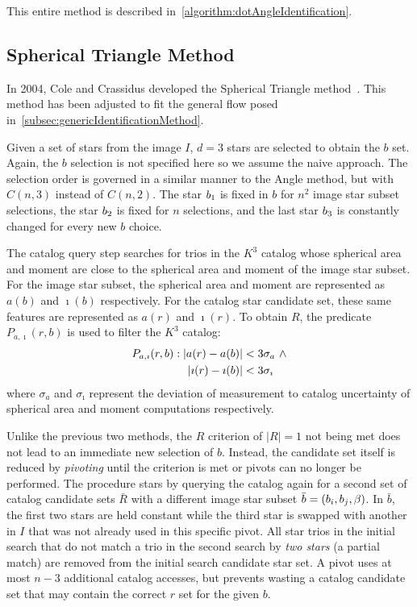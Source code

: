 This entire method is described in~\autoref{algorithm:dotAngleIdentification}.

\subsection{Spherical Triangle Method}\label{subsec:sphericalTriangleMethod}
In 2004, Cole and Crassidus developed the Spherical Triangle method~\cite{Spherical}.
This method has been adjusted to fit the general flow posed in~\autoref{subsec:genericIdentificationMethod}.

Given a set of stars from the image $I$, $d = 3$ stars are selected to obtain the $b$ set.
Again, the $b$ selection is not specified here so we assume the naive approach.
The selection order is governed in a similar manner to the Angle method, but with $C(n, 3)$ instead of
$C(n, 2)$.
The star $b_1$ is fixed in $b$ for $n^2$ image star subset selections, the star $b_2$ is fixed for
$n$ selections, and the last star $b_3$ is constantly changed for every new $b$ choice.

The catalog query step searches for trios in the $K^3$ catalog whose spherical area and moment
are close to the spherical area and moment of the image star subset.
For the image star subset, the spherical area and moment are represented as $a(b)$ and $\imath(b)$ respectively.
For the catalog star candidate set, these same features are represented as $a(r)$ and $\imath(r)$.
To obtain $R$, the predicate $P_{a, \imath}(r, b)$ is used to filter the $K^3$ catalog:
\begin{equation}
    \begin{aligned}
        P_{a, \imath}(r, b) : \left|  a(r) - a(b) \right| &< 3\sigma_{a}
        \ \land \\ \left| \imath(r) - \imath(b) \right| &< 3\sigma_{\imath}
    \end{aligned}
\end{equation}
where $\sigma_a$ and $\sigma_\imath$ represent the deviation of measurement to catalog uncertainty of spherical area
and moment computations respectively.

Unlike the previous two methods, the $R$ criterion of $|R| = 1$ not being met does not lead to an immediate new
selection of $b$.
Instead, the candidate set itself is reduced by \textit{pivoting} until the criterion is met or pivots can no longer
be performed.
The procedure stars by querying the catalog again for a second set of catalog candidate sets $\bar{R}$ with a
different image star subset $\bar{b} = \left(b_i, b_j, \beta\right)$.
In $\bar{b}$, the first two stars are held constant while the third star is swapped with another in $I$ that was not
already used in this specific pivot.
All star trios in the initial search that do not match a trio in the second search by \textit{two stars} (a partial
match) are removed from the initial search candidate star set.
A pivot uses at most $n - 3$ additional catalog accesses, but prevents wasting a catalog candidate set that may contain
the correct $r$ set for the given $b$.

